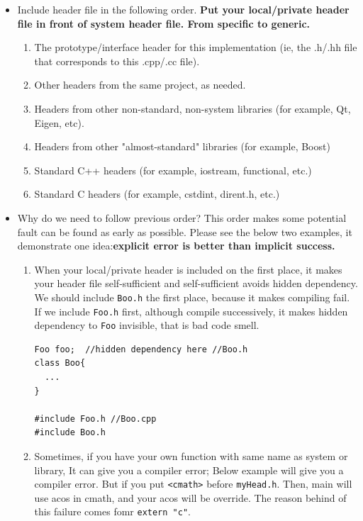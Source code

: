 \documentclass[a4paper,11pt,twoside]{book}
\begin{document}
\begin{itemize}
	\item Include header file in the following order. \textbf{Put your local/private header file in front of system header file. From specific to generic.} 
	\begin{enumerate}
		\item The prototype/interface header for this implementation (ie, the .h/.hh file that corresponds to this .cpp/.cc file).
		\item Other headers from the same project, as needed.
		\item Headers from other non-standard, non-system libraries (for example, Qt, Eigen, etc).
		\item Headers from other "almost-standard" libraries (for example, Boost)
		\item Standard C++ headers (for example, iostream, functional, etc.)
		\item Standard C headers (for example, cstdint, dirent.h, etc.)
	\end{enumerate}
	
    \item Why do we need to follow previous order?  This order makes some potential fault can be found as early as possible. Please see the below two examples, it demonstrate one idea:\textbf{explicit error is better than implicit success.}
	
	\begin{enumerate}

			\item When your local/private header is included on the first place, it makes your header file self-sufficient and self-sufficient avoids hidden dependency. We should include \texttt{Boo.h} the first place, because it makes compiling fail. If we include \texttt{Foo.h} first, although compile successively, it makes hidden dependency to \texttt{Foo} invisible, that is bad code smell. 

\begin{lstlisting}[numbers=none]
Foo foo;  //hidden dependency here //Boo.h
class Boo{
  ...
}

#include Foo.h //Boo.cpp
#include Boo.h 
\end{lstlisting}
			
			\item Sometimes, if you have your own function with same name as system or library, It can give you a compiler error; Below example will give you a compiler error. But if you put \texttt{<cmath>} before \texttt{myHead.h}. Then, main will use acos in cmath, and your acos will be override. The reason behind of this failure comes fomr \texttt{extern "c"}.
		

\end{enumerate}
\end{itemize}
\end{document}
